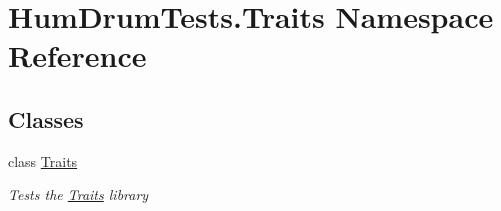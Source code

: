 \hypertarget{namespaceHumDrumTests_1_1Traits}{}\section{Hum\+Drum\+Tests.\+Traits Namespace Reference}
\label{namespaceHumDrumTests_1_1Traits}
\subsection*{Classes}
\begin{DoxyCompactItemize}
\item 
class \hyperlink{classHumDrumTests_1_1Traits_1_1Traits}{Traits}
\begin{DoxyCompactList}\small\item\em Tests the \hyperlink{classHumDrumTests_1_1Traits_1_1Traits}{Traits} library \end{DoxyCompactList}\end{DoxyCompactItemize}
